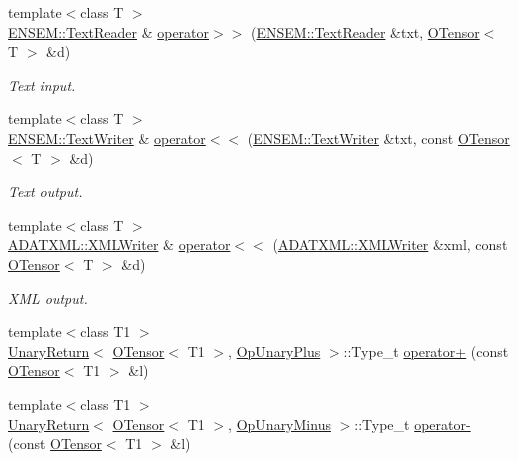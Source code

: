 \begin{DoxyCompactItemize}
{\footnotesize template$<$class T $>$ }\\\mbox{\hyperlink{classENSEM_1_1TextReader}{E\+N\+S\+E\+M\+::\+Text\+Reader}} \& \mbox{\hyperlink{group__obstensor_ga605e67dfa1237293bf39540ec4000032}{operator$>$$>$}} (\mbox{\hyperlink{classENSEM_1_1TextReader}{E\+N\+S\+E\+M\+::\+Text\+Reader}} \&txt, \mbox{\hyperlink{classENSEM_1_1OTensor}{O\+Tensor}}$<$ T $>$ \&d)
\begin{DoxyCompactList}\small\item\em Text input. \end{DoxyCompactList}\item 
{\footnotesize template$<$class T $>$ }\\\mbox{\hyperlink{classENSEM_1_1TextWriter}{E\+N\+S\+E\+M\+::\+Text\+Writer}} \& \mbox{\hyperlink{group__obstensor_ga64bc4e87abaefe7d97e074a4cb88e035}{operator$<$$<$}} (\mbox{\hyperlink{classENSEM_1_1TextWriter}{E\+N\+S\+E\+M\+::\+Text\+Writer}} \&txt, const \mbox{\hyperlink{classENSEM_1_1OTensor}{O\+Tensor}}$<$ T $>$ \&d)
\begin{DoxyCompactList}\small\item\em Text output. \end{DoxyCompactList}\item 
{\footnotesize template$<$class T $>$ }\\\mbox{\hyperlink{classADATXML_1_1XMLWriter}{A\+D\+A\+T\+X\+M\+L\+::\+X\+M\+L\+Writer}} \& \mbox{\hyperlink{group__obstensor_gaa5233df95541acbbe7762e49152aaeb5}{operator$<$$<$}} (\mbox{\hyperlink{classADATXML_1_1XMLWriter}{A\+D\+A\+T\+X\+M\+L\+::\+X\+M\+L\+Writer}} \&xml, const \mbox{\hyperlink{classENSEM_1_1OTensor}{O\+Tensor}}$<$ T $>$ \&d)
\begin{DoxyCompactList}\small\item\em X\+ML output. \end{DoxyCompactList}\item 
{\footnotesize template$<$class T1 $>$ }\\\mbox{\hyperlink{structENSEM_1_1UnaryReturn}{Unary\+Return}}$<$ \mbox{\hyperlink{classENSEM_1_1OTensor}{O\+Tensor}}$<$ T1 $>$, \mbox{\hyperlink{structENSEM_1_1OpUnaryPlus}{Op\+Unary\+Plus}} $>$\+::Type\+\_\+t \mbox{\hyperlink{group__obstensor_ga1b7029ac61e62bdd191703e814e622b3}{operator+}} (const \mbox{\hyperlink{classENSEM_1_1OTensor}{O\+Tensor}}$<$ T1 $>$ \&l)
\item 
{\footnotesize template$<$class T1 $>$ }\\\mbox{\hyperlink{structENSEM_1_1UnaryReturn}{Unary\+Return}}$<$ \mbox{\hyperlink{classENSEM_1_1OTensor}{O\+Tensor}}$<$ T1 $>$, \mbox{\hyperlink{structENSEM_1_1OpUnaryMinus}{Op\+Unary\+Minus}} $>$\+::Type\+\_\+t \mbox{\hyperlink{group__obstensor_gab017a217eb9e1e85386eb640bca457ab}{operator-\/}} (const \mbox{\hyperlink{classENSEM_1_1OTensor}{O\+Tensor}}$<$ T1 $>$ \&l)

\end{DoxyCompactItemize}
